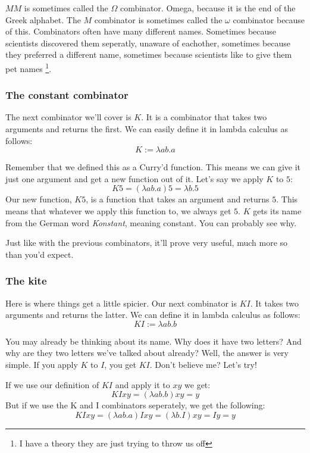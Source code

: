 \documentclass[11pt]{article}
\begin{document}
\(M M\) is sometimes called the \(\Omega\) combinator. Omega, because it is the
end of the Greek alphabet. The \(M\) combinator is sometimes called the
\(\omega\) combinator because of this. Combinators often have many different
names. Sometimes because scientists discovered them seperatly, unaware of
eachother, sometimes because they preferred a different name, sometimes because
scientists like to give them pet names \footnote{I have a theory they are just
trying to throw us off}.

\subsubsection{The constant combinator}

The next combinator we'll cover is \(K\). It is a combinator that takes two
arguments and returns the first. We can easily define it in lambda calculus as
follows:
\[K:=\lambda ab.a\]

Remember that we defined this as a Curry'd function. This means we can give it
just one argument and get a new function out of it. Let's say we apply \(K\) to
\(5\):
\[K5=(\lambda ab.a)5=\lambda b.5\]
Our new function, \(K5\), is a function that takes an argument and returns
\(5\). This means that whatever we apply this function to, we always get \(5\).
\(K\) gets its name from the German word \emph{Konstant}, meaning constant. You
can probably see why.

Just like with the previous combinators, it'll prove very useful, much more so
than you'd expect.

\subsubsection{The kite}

Here is where things get a little spicier. Our next combinator is \(KI\). It
takes two arguments and returns the latter. We can define it in lambda calculus
as follows:
\[KI:=\lambda ab.b\]

You may already be thinking about its name. Why does it have two letters? And
why are they two letters we've talked about already? Well, the answer is very
simple. If you apply \(K\) to \(I\), you get \(KI\). Don't believe me? Let's
try!

If we use our definition of \(KI\) and apply it to \(xy\) we get:
\[KIxy=(\lambda ab.b)xy=y\]
But if we use the K and I combinators seperately, we get the following:
\[KIxy=(\lambda ab.a)Ixy=(\lambda b.I)xy=Iy=y\]
\end{document}
